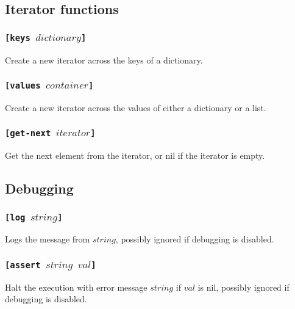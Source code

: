 \subsection{Iterator functions}
\subsubsection{\tt{[keys }$dictionary$\tt{]}}
Create a new iterator across the keys of a dictionary.
\subsubsection{\tt{[values }$container$\tt{]}}
Create a new iterator across the values of either a dictionary or a list.
\subsubsection{\tt{[get-next }$iterator$\tt{]}}
Get the next element from the iterator, or nil if the iterator is empty.

\subsection{Debugging}
\subsubsection{\tt{[log }$string$\tt{]}}
Logs the message from $string$, possibly ignored if debugging is disabled.
\subsubsection{\tt{[assert }$string$ $val$\tt{]}}
Halt the execution with error message $string$ if $val$ is nil, possibly ignored if debugging is disabled.

